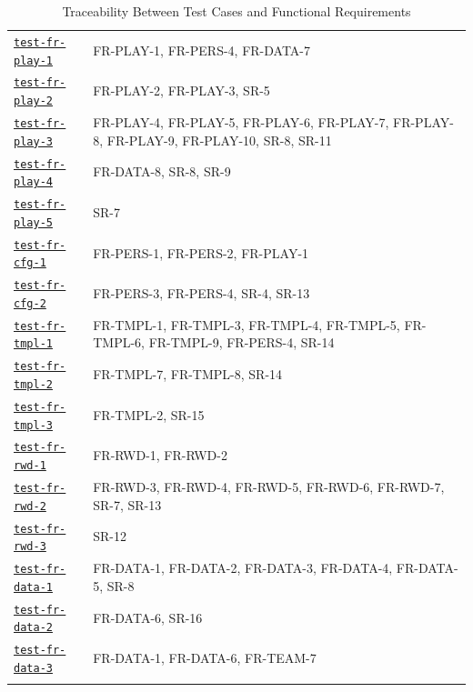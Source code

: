 \documentclass[12pt, titlepage]{article}
\newcommand{\srsref}[1]{#1}
\newcommand{\testcaseref}[1]{\hyperref[#1]{\texttt{#1}}}
\begin{document}
\begin{longtable}{p{} p{}}
\midrule
\testcaseref{test-fr-play-1} & \srsref{FR-PLAY-1}, \srsref{FR-PERS-4}, \srsref{FR-DATA-7} \\
\testcaseref{test-fr-play-2} & \srsref{FR-PLAY-2}, \srsref{FR-PLAY-3}, \srsref{SR-5} \\
\testcaseref{test-fr-play-3} & \srsref{FR-PLAY-4}, \srsref{FR-PLAY-5}, \srsref{FR-PLAY-6}, \srsref{FR-PLAY-7}, \srsref{FR-PLAY-8}, \srsref{FR-PLAY-9}, \srsref{FR-PLAY-10}, \srsref{SR-8}, \srsref{SR-11} \\
\testcaseref{test-fr-play-4} & \srsref{FR-DATA-8}, \srsref{SR-8}, \srsref{SR-9} \\
\testcaseref{test-fr-play-5} & \srsref{SR-7} \\
\midrule
\testcaseref{test-fr-cfg-1} & \srsref{FR-PERS-1}, \srsref{FR-PERS-2}, \srsref{FR-PLAY-1} \\
\testcaseref{test-fr-cfg-2} & \srsref{FR-PERS-3}, \srsref{FR-PERS-4}, \srsref{SR-4}, \srsref{SR-13} \\
\testcaseref{test-fr-tmpl-1} & \srsref{FR-TMPL-1}, \srsref{FR-TMPL-3}, \srsref{FR-TMPL-4}, \srsref{FR-TMPL-5}, \srsref{FR-TMPL-6}, \srsref{FR-TMPL-9}, \srsref{FR-PERS-4}, \srsref{SR-14} \\
\testcaseref{test-fr-tmpl-2} & \srsref{FR-TMPL-7}, \srsref{FR-TMPL-8}, \srsref{SR-14} \\
\testcaseref{test-fr-tmpl-3} & \srsref{FR-TMPL-2}, \srsref{SR-15} \\
\midrule
\testcaseref{test-fr-rwd-1} & \srsref{FR-RWD-1}, \srsref{FR-RWD-2} \\
\testcaseref{test-fr-rwd-2} & \srsref{FR-RWD-3}, \srsref{FR-RWD-4}, \srsref{FR-RWD-5}, \srsref{FR-RWD-6}, \srsref{FR-RWD-7}, \srsref{SR-7}, \srsref{SR-13} \\
\testcaseref{test-fr-rwd-3} & \srsref{SR-12} \\
\midrule
\testcaseref{test-fr-data-1} & \srsref{FR-DATA-1}, \srsref{FR-DATA-2}, \srsref{FR-DATA-3}, \srsref{FR-DATA-4}, \srsref{FR-DATA-5}, \srsref{SR-8} \\
\testcaseref{test-fr-data-2} & \srsref{FR-DATA-6}, \srsref{SR-16} \\
\testcaseref{test-fr-data-3} & \srsref{FR-DATA-1}, \srsref{FR-DATA-6}, \srsref{FR-TEAM-7} \\
\bottomrule
\caption{Traceability Between Test Cases and Functional Requirements}
\label{tab:TC2NFRtm}

\end{longtable}
\end{document}
